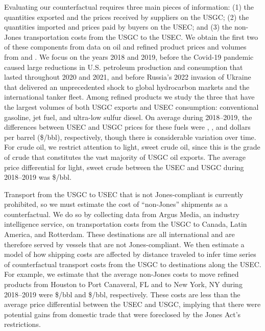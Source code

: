 \documentclass[12pt]{article}
\begin{document}
Evaluating our counterfactual requires three main pieces of information: (1) the quantities exported and the prices received by suppliers on the USGC; (2) the quantities imported and prices paid by buyers on the USEC; and (3) the non-Jones transportation costs from the USGC to the USEC. We obtain the first two of these components from data on oil and refined product prices and volumes from \cite{Bloomberg2023} and \cite{EIApetroleum}. We focus on the years 2018 and 2019, before the Covid-19 pandemic caused large reductions in U.S. petroleum production and consumption that lasted throughout 2020 and 2021, and before Russia's 2022 invasion of Ukraine that delivered an unprecedented shock to global hydrocarbon markets and the international tanker fleet. Among refined products we study the three that have the largest volumes of both USGC exports and USEC consumption: conventional gasoline, jet fuel, and ultra-low sulfur diesel. On average during 2018--2019, the differences between USEC and USGC prices for these fuels were \unskip, \unskip, and dollars per barrel (\$/bbl), respectively, though there is considerable variation over time. For crude oil, we restrict attention to light, sweet crude oil, since this is the grade of crude that constitutes the vast majority of USGC oil exports. The average price differential for light, sweet crude between the USEC and USGC during 2018--2019 was \$\unskip/bbl.

Transport from the USGC to USEC that is not Jones-compliant is currently prohibited, so we must estimate the cost of ``non-Jones'' shipments as a counterfactual. We do so by collecting data from Argus Media, an industry intelligence service, on transportation costs from the USGC to Canada, Latin America, and Rotterdam. These destinations are all international and are therefore served by vessels that are not Jones-compliant. We then estimate a model of how shipping costs are affected by distance traveled to infer time series of counterfactual transport costs from the USGC to destinations along the USEC. For example, we estimate that the average non-Jones costs to move refined products from Houston to Port Canaveral, FL and to New York, NY during 2018--2019 were \$\unskip/bbl and \$\unskip/bbl, respectively. These costs are less than the average price differential between the USEC and USGC, implying that there were potential gains from domestic trade that were foreclosed by the Jones Act's restrictions.
\end{document}
